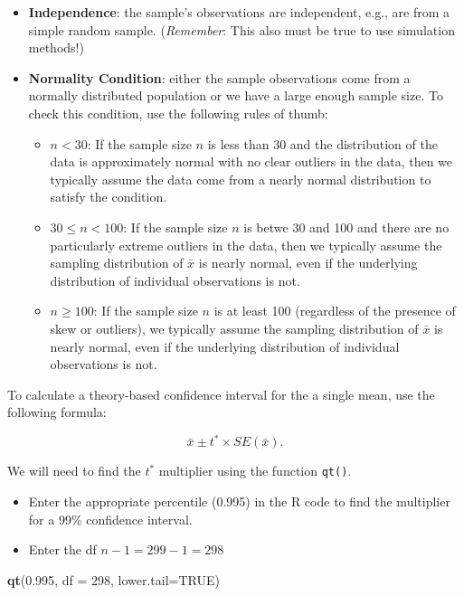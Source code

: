 \documentclass[
]{report}
\newenvironment{Shaded}{\begin{snugshade}}{\end{snugshade}}
\newcommand{\AttributeTok}[1]{\textcolor[rgb]{0.13,0.29,0.53}{#1}}
\newcommand{\ConstantTok}[1]{\textcolor[rgb]{0.56,0.35,0.01}{#1}}
\newcommand{\DecValTok}[1]{\textcolor[rgb]{0.00,0.00,0.81}{#1}}
\newcommand{\FloatTok}[1]{\textcolor[rgb]{0.00,0.00,0.81}{#1}}
\newcommand{\FunctionTok}[1]{\textcolor[rgb]{0.13,0.29,0.53}{\textbf{#1}}}
\newcommand{\NormalTok}[1]{#1}
\begin{document}
\begin{itemize}
\item
  \textbf{Independence}: the sample's observations are independent, e.g., are from a simple random sample. (\emph{Remember}: This also must be true to use simulation methods!)
\item
  \textbf{Normality Condition}: either the sample observations come from a normally distributed population or we have a large enough sample size. To check this condition, use the following rules of thumb:

  \begin{itemize}
  \item
    \(n < 30\): If the sample size \(n\) is less than 30 and the distribution of the data is approximately normal with no clear outliers in the data, then we typically assume the data come from a nearly normal distribution to satisfy the condition.
  \item
    \(30 \leq n < 100\): If the sample size \(n\) is betwe 30 and 100 and there are no particularly extreme outliers in the data, then we typically assume the sampling distribution of \(\bar{x}\) is nearly normal, even if the underlying distribution of individual observations is not.
  \item
    \(n \geq 100\): If the sample size \(n\) is at least 100 (regardless of the presence of skew or outliers), we typically assume the sampling distribution of \(\bar{x}\) is nearly normal, even if the underlying distribution of individual observations is not.
  \end{itemize}
\end{itemize}

\newpage

To calculate a theory-based confidence interval for the a single mean, use the following formula:

\[\bar{x}\pm t^* \times SE(\bar{x}).\]

We will need to find the \(t^*\) multiplier using the function \texttt{qt()}.

\begin{itemize}
\item
  Enter the appropriate percentile (0.995) in the R code to find the multiplier for a 99\% confidence interval.
\item
  Enter the df \(n - 1 = 299 - 1 = 298\)
\end{itemize}

\begin{Shaded}
\begin{Highlighting}[]
\FunctionTok{qt}\NormalTok{(}\FloatTok{0.995}\NormalTok{, }\AttributeTok{df =} \DecValTok{298}\NormalTok{, }\AttributeTok{lower.tail=}\ConstantTok{TRUE}\NormalTok{)}
\end{Highlighting}
\end{Shaded}
\end{document}
